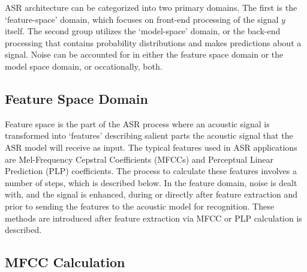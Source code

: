 ASR architecture can be categorized into two primary domains. The first is the `feature-space' domain, which focuses on front-end processing of the signal $y$ itself.  The second group utilizes the `model-space' domain, or the back-end processing that contains probability distributions and makes predictions about a signal. %
Noise can be accounted for in either the feature space domain or the model space domain, or occationally, both.  %

\subsection{Feature Space Domain}

Feature space is the part of the ASR process where an acoustic signal is transformed into `features' describing salient parts the acoustic signal that the ASR model will receive as input. The typical features used in ASR applications are Mel-Frequency Cepstral Coefficients (MFCCs) and Perceptual Linear Prediction (PLP) coefficients. The process to calculate these features involves a number of steps, which is described below.  In the feature domain, noise is dealt with, and the signal is enhanced, during or directly after feature extraction and prior to sending the features to the acoustic model for recognition.  These methods are introduced after feature extraction via MFCC or PLP calculation is described.

\subsection{MFCC Calculation}\label{sec:mfcc-calc}


